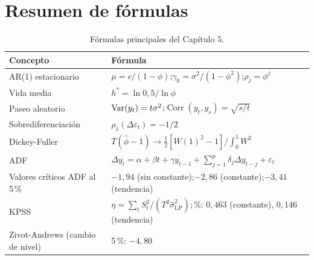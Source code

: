 \section{Resumen de fórmulas}

\begin{table}[H]
\centering\small
\begin{tabular}{@{}ll@{}}
\toprule
Concepto & Fórmula \\
\midrule
AR(1) estacionario & $\mu=c/(1-\phi)$;\quad $\gamma_0=\sigma^2/(1-\phi^2)$;\quad $\rho_j=\phi^j$ \\
Vida media & $h^*=\ln0{,}5/\ln\phi$ \\
Paseo aleatorio & $\operatorname{Var}(y_t)=t\sigma^2$;\quad $\operatorname{Corr}(y_t,y_s)=\sqrt{s/t}$ \\
Sobrediferenciación & $\rho_1(\Delta\varepsilon_t)=-1/2$ \\
Dickey-Fuller & $T(\hat\phi-1)\to\frac12[W(1)^2-1]/\int_0^1W^2$ \\
ADF & $\Delta y_t=\alpha+\beta t+\gamma y_{t-1}+\sum_{j=1}^p\delta_j\Delta y_{t-j}+\varepsilon_t$ \\
Valores críticos ADF al 5\,\% & $-1{,}94$ (sin constante);\quad $-2{,}86$ (constante);\quad $-3{,}41$ (tendencia) \\
KPSS & $\eta=\sum_tS_t^2/(T^2\hat\sigma^2_{\mathrm{LP}})$;\quad 5\,\%: $0{,}463$ (constante), $0{,}146$ (tendencia) \\
Zivot-Andrews (cambio de nivel) & 5\,\%: $-4{,}80$ \\
\bottomrule
\end{tabular}
\caption{Fórmulas principales del Capítulo 5.}
\end{table}

